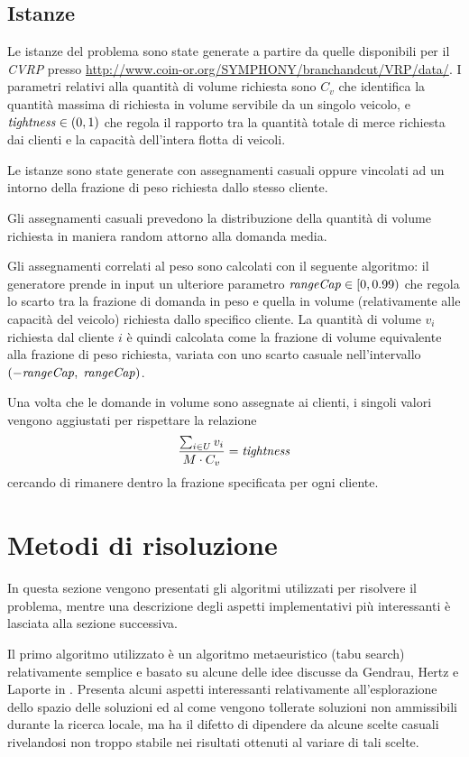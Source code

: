 \documentclass[11pt,oneside,a4paper]{article}
\begin{document}
\subsection{Istanze}
Le istanze del problema sono state generate a partire da quelle disponibili
per il \emph{CVRP} presso \url{http://www.coin-or.org/SYMPHONY/branchandcut/VRP/data/}.
I parametri relativi alla quantità di volume richiesta sono $C_v$ che identifica la quantità
massima di richiesta in volume servibile da un singolo veicolo, e $\text{\emph{tightness}} \in (0,1)$
che regola il rapporto tra la quantità totale di merce richiesta dai clienti e la capacità
dell'intera flotta di veicoli.

Le istanze sono state generate con assegnamenti casuali oppure vincolati ad un intorno
della frazione di peso richiesta dallo stesso cliente.

Gli assegnamenti casuali prevedono la distribuzione della quantità di volume richiesta in maniera random
attorno alla domanda media.

Gli assegnamenti correlati al peso sono calcolati con il seguente algoritmo:
il generatore prende in input un ulteriore parametro $\text{\emph{rangeCap}} \in [0,0.99)$
che regola lo scarto tra la frazione di domanda in peso e quella in volume
(relativamente alle capacità del veicolo) richiesta dallo specifico cliente.
La quantità di volume $v_i$ richiesta dal cliente $i$ è quindi calcolata come la frazione
di volume equivalente alla frazione di peso richiesta, variata con uno scarto casuale
nell'intervallo $(-\text{\emph{rangeCap}},\;\text{\emph{rangeCap}})$.

Una volta che le domande in volume sono assegnate ai clienti, i singoli valori vengono
aggiustati per rispettare la relazione
\begin{equation*}
  \frac{\sum_{i \in U} v_i}{M \cdot C_v} = \text{\emph{tightness}}
\end{equation*}
cercando di rimanere dentro la frazione specificata per ogni cliente.

\section{Metodi di risoluzione}
In questa sezione vengono presentati gli algoritmi utilizzati per risolvere il problema, mentre
una descrizione degli aspetti implementativi più interessanti è lasciata alla sezione successiva.

Il primo algoritmo utilizzato è un algoritmo metaeuristico (tabu search) relativamente semplice
e basato su alcune delle idee discusse da Gendrau, Hertz e Laporte in \cite{gend94}. Presenta alcuni aspetti
interessanti relativamente all'esplorazione dello spazio delle soluzioni ed al come vengono
tollerate soluzioni non ammissibili durante la ricerca locale, ma ha il difetto di dipendere da
alcune scelte casuali rivelandosi non troppo stabile nei risultati ottenuti al variare di tali
scelte.
\end{document}
